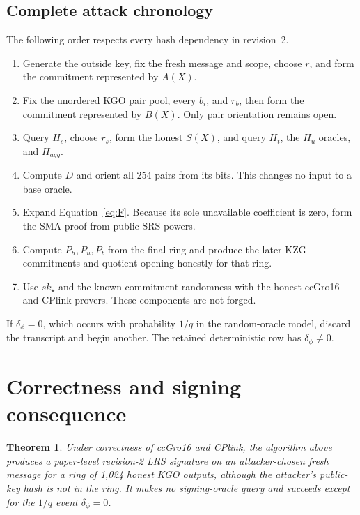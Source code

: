 \documentclass[10pt,a4paper]{article}
\newtheorem{theorem}{Theorem}
\begin{document}
\subsection{Complete attack chronology}

The following order respects every hash dependency in revision~2.
\begin{enumerate}
  \item Generate the outside key, fix the fresh message and scope, choose
        $r$, and form the commitment represented by $A(X)$.
  \item Fix the unordered KGO pair pool, every $b_i$, and $r_b$, then form
        the commitment represented by $B(X)$. Only pair orientation remains
        open.
  \item Query $H_s$, choose $r_s$, form the honest $S(X)$, and query
        $H_t$, the $H_u$ oracles, and $H_{agg}$.
  \item Compute $D$ and orient all 254 pairs from its bits. This changes no
        input to a base oracle.
  \item Expand Equation~\eqref{eq:F}. Because its sole unavailable
        coefficient is zero, form the SMA proof from public SRS powers.
  \item Compute $P_h,P_u,P_t$ from the final ring and produce the later KZG
        commitments and quotient opening honestly for that ring.
  \item Use $sk_\star$ and the known commitment randomness with the honest
        ccGro16 and CPlink provers. These components are not forged.
\end{enumerate}
If $\delta_\phi=0$, which occurs with probability $1/q$ in the random-oracle
model, discard the transcript and begin another. The retained deterministic
row has $\delta_\phi\neq0$.

\section{Correctness and signing consequence}

\begin{theorem}\label{thm:forge}
Under correctness of ccGro16 and CPlink, the algorithm above produces a
paper-level revision-2 LRS signature on an attacker-chosen fresh message for a
ring of 1,024 honest KGO outputs, although the attacker's public-key hash is
not in the ring. It makes no signing-oracle query and succeeds except for the
$1/q$ event $\delta_\phi=0$.
\end{theorem}
\end{document}
